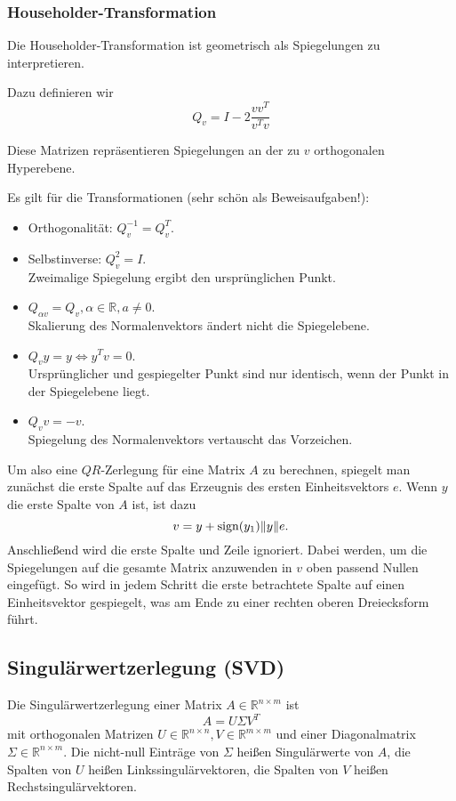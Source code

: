 \documentclass[a4paper,parskip=half*,DIV=7,fontsize=11pt]{scrartcl}
\DeclarePairedDelimiter\norm{\lVert}{\rVert}
\DeclareMathOperator\sign{sign}
\begin{document}
\subsubsection{Householder-Transformation}

Die Householder-Transformation ist geometrisch als Spiegelungen zu interpretieren.

Dazu definieren wir
\[ Q_v = I - 2 \frac{v v^T}{v^T v} \]

Diese Matrizen repräsentieren Spiegelungen an der zu $v$ orthogonalen Hyperebene.

Es gilt für die Transformationen (sehr schön als Beweisaufgaben!):

\begin{itemize}
  \item Orthogonalität: $Q_v^{-1} = Q_v^T$.
  \item Selbstinverse: $Q_v^2 = I$.\\Zweimalige Spiegelung ergibt den ursprünglichen Punkt.
  \item $Q_{\alpha v} = Q_v, \alpha \in \mathbb{R}, a \neq 0$.\\Skalierung des Normalenvektors ändert nicht die Spiegelebene.
  \item $Q_v y = y \Leftrightarrow y^T v = 0$.\\
        Ursprünglicher und gespiegelter Punkt sind nur identisch, wenn der Punkt in der Spiegelebene liegt.
  \item $Q_v v = -v$.\\
        Spiegelung des Normalenvektors vertauscht das Vorzeichen.   
\end{itemize}

Um also eine $QR$-Zerlegung für eine Matrix $A$ zu berechnen, spiegelt man zunächst die erste Spalte auf das Erzeugnis des ersten Einheitsvektors $e$. Wenn $y$ die erste Spalte von $A$ ist, ist dazu 
\[v = y + \sign(y_1) \norm{y}e.\]
Anschließend wird die erste Spalte und Zeile ignoriert. Dabei werden, um die Spiegelungen auf die gesamte Matrix anzuwenden in $v$ oben passend Nullen eingefügt. So wird in jedem Schritt die erste betrachtete Spalte auf einen Einheitsvektor gespiegelt, was am Ende zu einer rechten oberen Dreiecksform führt.

\subsection{Singulärwertzerlegung (SVD)}

Die Singulärwertzerlegung einer Matrix $A \in \mathbb{R}^{n \times m}$ ist
\[A = U\Sigma V^T\]
mit orthogonalen Matrizen $U \in \mathbb{R}^{n \times n}, V \in \mathbb{R}^{m \times m}$ und einer Diagonalmatrix $\Sigma \in \mathbb{R}^{n \times m}$. Die nicht-null Einträge von $\Sigma$ heißen Singulärwerte von $A$, die Spalten von $U$ heißen Linkssingulärvektoren, die Spalten von $V$ heißen Rechstsingulärvektoren.
\end{document}
